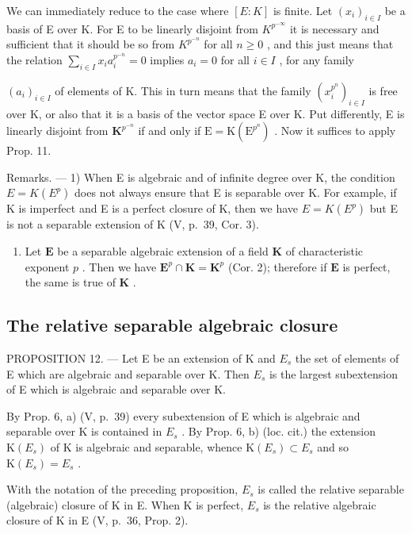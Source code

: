 We can immediately reduce to the case where \([E:K]\) is finite. Let \((x_{i})_{i\in I}\) be a basis of E over K. For E to be linearly disjoint from \(K^{p^{-\infty}}\) it is necessary and sufficient that it should be so from \(K^{p^{-n}}\) for all \(n\geqslant0\) , and this just means that the relation \(\sum_{i\in I}x_{i}a_{i}^{p^{-n}}=0\) implies \(a_{i}=0\) for all \(i\in I\) , for any family

\((a_{i})_{i\in I}\) of elements of K. This in turn means that the family \((x_{i}^{p^{n}})_{i\in I}\) is free over K, or also that it is a basis of the vector space E over K. Put differently, E is linearly disjoint from \(\mathbf{K}^{p^{-n}}\) if and only if \(\mathrm{E} = \mathrm{K}(\mathrm{E}^{p^n})\) . Now it suffices to apply Prop. 11.

Remarks. --- 1) When E is algebraic and of infinite degree over K, the condition \(E = K(E^{p})\) does not always ensure that E is separable over K. For example, if K is imperfect and E is a perfect closure of K, then we have \(E = K(E^{p})\) but E is not a separable extension of K (V, p.~39, Cor. 3).

\begin{enumerate}
\def\labelenumi{\arabic{enumi})}
\setcounter{enumi}{1}
\tightlist
\item
  Let \(\mathbf{E}\) be a separable algebraic extension of a field \(\mathbf{K}\) of characteristic exponent \(p\) . Then we have \(\mathbf{E}^p \cap \mathbf{K} = \mathbf{K}^p\) (Cor. 2); therefore if \(\mathbf{E}\) is perfect, the same is true of \(\mathbf{K}\) .
\end{enumerate}

\subsection{The relative separable algebraic closure}

PROPOSITION 12. --- Let E be an extension of K and \(E_{s}\) the set of elements of E which are algebraic and separable over K. Then \(E_{s}\) is the largest subextension of E which is algebraic and separable over K.

By Prop. 6, a) (V, p.~39) every subextension of E which is algebraic and separable over K is contained in \(E_{s}\) . By Prop. 6, b) (loc. cit.) the extension \(\mathrm{K}(E_{s})\) of K is algebraic and separable, whence \(\mathrm{K}(E_{s}) \subset E_{s}\) and so \(\mathrm{K}(E_{s}) = E_{s}\) .

With the notation of the preceding proposition, \(E_{s}\) is called the relative separable (algebraic) closure of K in E. When K is perfect, \(E_{s}\) is the relative algebraic closure of K in E (V, p.~36, Prop. 2).

